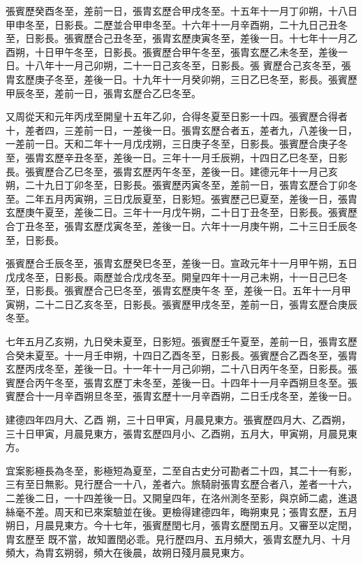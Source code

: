 \begin{pinyinscope}
 張賓歷癸酉冬至，差前一日，張胄玄歷合甲戌冬至。十五年十一月丁卯朔，十八日甲申冬至，日影長。二歷並合甲申冬至。十六年十一月辛酉朔，二十九日己丑冬至，日影長。張賓歷合己丑冬至，張胄玄歷庚寅冬至，差後一日。十七年十一月乙酉朔，十日甲午冬至，日影長。張賓歷合甲午冬至，張胄玄歷乙未冬至，差後一日。十八年十一月己卯朔，二十一日己亥冬至，日影長。張
 賓歷合己亥冬至，張胄玄歷庚子冬至，差後一日。十九年十一月癸卯朔，三日乙巳冬至，影長。張賓歷甲辰冬至，差前一日，張胄玄歷合乙巳冬至。



 又周從天和元年丙戌至開皇十五年乙卯，合得冬夏至日影一十四。張賓歷合得者十，差者四，三差前一日，一差後一日。張胄玄歷合者五，差者九，八差後一日，一差前一日。天和二年十一月戊戌朔，三日庚子冬至，日影長。張賓歷合庚子冬至，張胄玄歷辛丑冬至，差後一日。三年十一月壬辰朔，十四日乙巳冬至，日影長。張賓歷合乙巳冬至，張胄玄歷丙午冬至，差後一日。建德元年十一月己亥
 朔，二十九日丁卯冬至，日影長。張賓歷丙寅冬至，差前一日，張胄玄歷合丁卯冬至。二年五月丙寅朔，三日戊辰夏至，日影短。張賓歷己巳夏至，差後一日，張胄玄歷庚午夏至，差後二日。三年十一月戊午朔，二十日丁丑冬至，日影長。張賓歷合丁丑冬至，張胄玄歷戊寅冬至，差後一日。六年十一月庚午朔，二十三日壬辰冬至，日影長。



 張賓歷合壬辰冬至，張胄玄歷癸巳冬至，差後一日。宣政元年十一月甲午朔，五日戊戌冬至，日影長。兩歷並合戊戌冬至。開皇四年十一月己未朔，十一日己巳冬至，日影長。張賓歷合己巳冬至，張胄玄歷庚午冬
 至，差後一日。五年十一月甲寅朔，二十二日乙亥冬至，日影長。張賓歷甲戌冬至，差前一日，張胄玄歷合庚辰冬至。



 七年五月乙亥朔，九日癸未夏至，日影短。張賓歷壬午夏至，差前一日，張胄玄歷合癸未夏至。十一月壬申朔，十四日乙酉冬至，日影長。張賓歷合乙酉冬至，張胄玄歷丙戌冬至，差後一日。十一年十一月己卯朔，二十八日丙午冬至，日影長。張賓歷合丙午冬至，張胄玄歷丁未冬至，差後一日。十四年十一月辛酉朔旦冬至。張賓歷合十一月辛酉朔旦冬至，張胄玄歷十一月辛酉朔，二日壬戌冬至，差後一日。



 建德四年四月大、乙酉
 朔，三十日甲寅，月晨見東方。張賓歷四月大、乙酉朔，三十日甲寅，月晨見東方，張胄玄歷四月小、乙酉朔，五月大，甲寅朔，月晨見東方。



 宜案影極長為冬至，影極短為夏至，二至自古史分可勘者二十四，其二十一有影，三有至日無影。見行歷合一十八，差者六。旅騎尉張胄玄歷合者八，差者一十六，二差後二日，一十四差後一日。又開皇四年，在洛州測冬至影，與京師二處，進退絲毫不差。周天和已來案驗並在後。更檢得建德四年，晦朔東見；張胄玄歷，五月朔日，月晨見東方。今十七年，張賓歷閏七月，張胄玄歷閏五月。又審至以定閏，胄玄歷至
 既不當，故知置閏必乖。見行歷四月、五月頻大，張胄玄歷九月、十月頻大，為胄玄朔弱，頻大在後晨，故朔日殘月晨見東方。




\end{pinyinscope}
